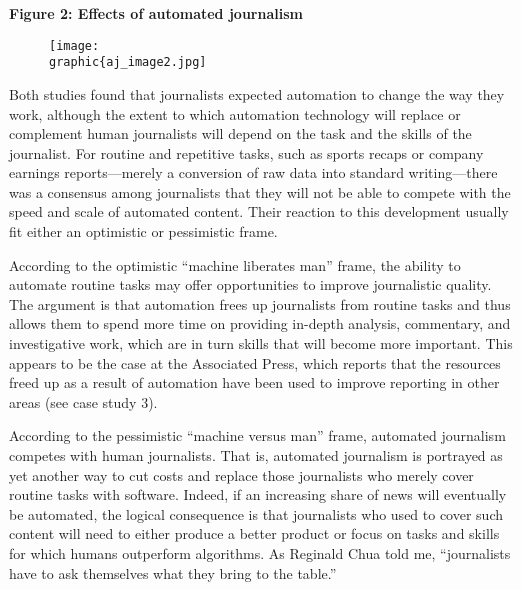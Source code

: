 \documentclass[notoc, symmetric, nobib, nols]{towcenter-guideto-book}
\begin{document}
\textbf{Figure 2: Effects of automated journalism}
\begin{figure}
\begin{centering}
\texttt{[image: \\graphic\{aj\_image2.jpg]}
\end{centering}
\end{figure}

Both studies found that journalists expected automation to change the way they work, although the extent to which automation technology will replace or complement human journalists will depend on the task and the skills of the journalist. For routine and repetitive tasks, such as sports recaps or company earnings reports---merely a conversion of raw data into standard writing---there was a consensus among journalists that they will not be able to compete with the speed and scale of automated content. Their reaction to this development usually fit either an optimistic or pessimistic frame. 

According to the optimistic ``machine liberates man'' frame, the ability to automate routine tasks may offer opportunities to improve journalistic quality. The argument is that automation frees up journalists from routine tasks and thus allows them to spend more time on providing in-depth analysis, commentary, and investigative work, which are in turn skills that will become more important. This appears to be the case at the Associated Press, which reports that the resources freed up as a result of automation have been used to improve reporting in other areas (see case study 3). 

According to the pessimistic ``machine versus man'' frame, automated journalism competes with human journalists. That is, automated journalism is portrayed as yet another way to cut costs and replace those journalists who merely cover routine tasks with software. Indeed, if an increasing share of news will eventually be automated, the logical consequence is that journalists who used to cover such content will need to either produce a better product or focus on tasks and skills for which humans outperform algorithms. As Reginald Chua told me, “journalists have to ask themselves what they bring to the table.”
\end{document}
